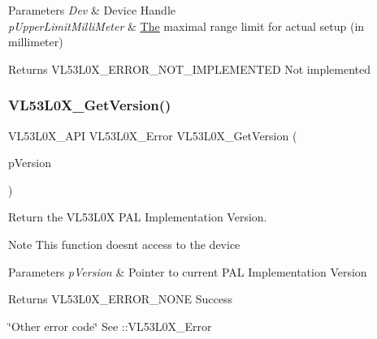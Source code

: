 \begin{DoxyParams}{Parameters}
{\em Dev} & Device Handle \\
\hline
{\em p\+Upper\+Limit\+Milli\+Meter} & \hyperlink{structThe}{The} maximal range limit for actual setup (in millimeter) \\
\hline
\end{DoxyParams}
\begin{DoxyReturn}{Returns}
V\+L53\+L0\+X\+\_\+\+E\+R\+R\+O\+R\+\_\+\+N\+O\+T\+\_\+\+I\+M\+P\+L\+E\+M\+E\+N\+T\+ED Not implemented 
\end{DoxyReturn}
\mbox{\label{group__VL53L0X__general__group_gadb15b4f97b7218b3bdf571f90c27ec5e}} 
\subsubsection{\texorpdfstring{V\+L53\+L0\+X\+\_\+\+Get\+Version()}{VL53L0X\_GetVersion()}}
{\footnotesize\ttfamily V\+L53\+L0\+X\+\_\+\+A\+PI V\+L53\+L0\+X\+\_\+\+Error V\+L53\+L0\+X\+\_\+\+Get\+Version (\begin{DoxyParamCaption}\item[{\hyperlink{structVL53L0X__Version__t}{V\+L53\+L0\+X\+\_\+\+Version\+\_\+t} $\ast$}]{p\+Version }\end{DoxyParamCaption})}



Return the V\+L53\+L0X P\+AL Implementation Version. 

\begin{DoxyNote}{Note}
This function doesn\textquotesingle{}t access to the device
\end{DoxyNote}

\begin{DoxyParams}{Parameters}
{\em p\+Version} & Pointer to current P\+AL Implementation Version \\
\hline
\end{DoxyParams}
\begin{DoxyReturn}{Returns}
V\+L53\+L0\+X\+\_\+\+E\+R\+R\+O\+R\+\_\+\+N\+O\+NE Success 

\char`\"{}\+Other error code\char`\"{} See \+::\+V\+L53\+L0\+X\+\_\+\+Error 
\end{DoxyReturn}
\mbox{\label{group__VL53L0X__general__group_ga907d0e788b6ea0c7368a4c5133e0cb6a}} 
